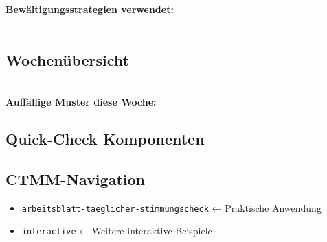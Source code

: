 \begin{ctmmOrangeBox}[title=Trigger-Bewertung]
\\[0.5cm]

\\[0.3cm]

\textbf{Bewältigungsstrategien verwendet:}\\
 \quad 
{} \quad 
{}\\
 \quad 
{} \quad 
{}
\end{ctmmOrangeBox}

\subsection*{\textcolor{ctmmPurple}{Wochenübersicht}}

\begin{ctmmPurpleBox}[title=7-Tage-Muster]
\\[0.3cm]

\textbf{Auffällige Muster diese Woche:}\\
\end{ctmmPurpleBox}

\subsection*{\textcolor{ctmmRed}{Quick-Check Komponenten}}


\vspace{0.5cm}


\subsection*{\textcolor{ctmmBlue}{CTMM-Navigation}}
\begin{itemize}
  \item \texttt{arbeitsblatt-taeglicher-stimmungscheck} ← Praktische Anwendung
  \item \texttt{interactive} ← Weitere interaktive Beispiele
\end{itemize}
